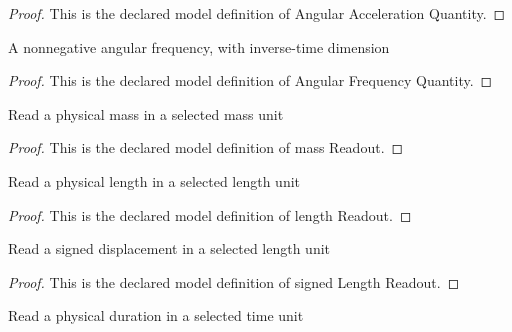 \begin{proof}
  This is the declared model definition of Angular Acceleration Quantity.
\end{proof}
\begin{definition}
  \label{def:physics:phyx-mini-0268:phyxminiproblems-problemphyxmini0268-angularfrequencyquantity}
  A nonnegative angular frequency, with inverse-time dimension
\end{definition}
\begin{proof}
  This is the declared model definition of Angular Frequency Quantity.
\end{proof}
\begin{definition}
  \label{def:physics:phyx-mini-0268:phyxminiproblems-problemphyxmini0268-massreadout}
  Read a physical mass in a selected mass unit
\end{definition}
\begin{proof}
  This is the declared model definition of mass Readout.
\end{proof}
\begin{definition}
  \label{def:physics:phyx-mini-0268:phyxminiproblems-problemphyxmini0268-lengthreadout}
  Read a physical length in a selected length unit
\end{definition}
\begin{proof}
  This is the declared model definition of length Readout.
\end{proof}
\begin{definition}
  \label{def:physics:phyx-mini-0268:phyxminiproblems-problemphyxmini0268-signedlengthreadout}
  Read a signed displacement in a selected length unit
\end{definition}
\begin{proof}
  This is the declared model definition of signed Length Readout.
\end{proof}
\begin{definition}
  \label{def:physics:phyx-mini-0268:phyxminiproblems-problemphyxmini0268-timereadout}
  Read a physical duration in a selected time unit
\end{definition}
